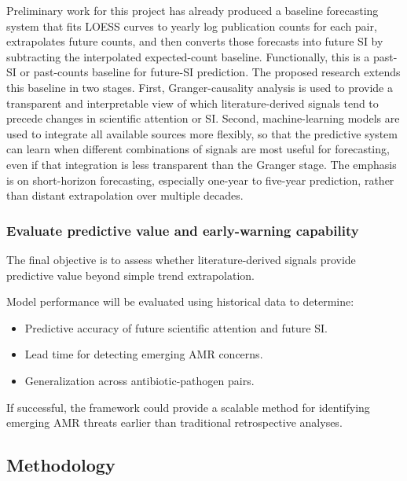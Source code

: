 \documentclass[
]{article}
\providecommand{\tightlist}{%
  \setlength{\itemsep}{0pt}\setlength{\parskip}{0pt}}
\begin{document}
Preliminary work for this project has already produced a baseline
forecasting system that fits LOESS curves to yearly log publication
counts for each pair, extrapolates future counts, and then converts
those forecasts into future SI by subtracting the interpolated
expected-count baseline. Functionally, this is a past-SI or past-counts
baseline for future-SI prediction. The proposed research extends this
baseline in two stages.
First, Granger-causality analysis is used to provide a transparent and
interpretable view of which literature-derived signals tend to precede
changes in scientific attention or SI. Second, machine-learning models
are used to integrate all available sources more flexibly, so that the
predictive system can learn when different combinations of signals are
most useful for forecasting, even if that integration is less
transparent than the Granger stage. The emphasis is on short-horizon
forecasting, especially one-year to five-year prediction, rather than
distant extrapolation over multiple decades.

\subsubsection{Evaluate predictive value and early-warning
capability}\label{objective-5-evaluate-predictive-value-and-early-warning-capability}

The final objective is to assess whether literature-derived signals
provide predictive value beyond simple trend extrapolation.

Model performance will be evaluated using historical data to determine:

\begin{itemize}
\tightlist
\item
  Predictive accuracy of future scientific attention and future SI.
\item
  Lead time for detecting emerging AMR concerns.
\item
  Generalization across antibiotic-pathogen pairs.
\end{itemize}

If successful, the framework could provide a scalable method for
identifying emerging AMR threats earlier than traditional retrospective
analyses.

\subsection{Methodology}\label{methodology}
\end{document}
